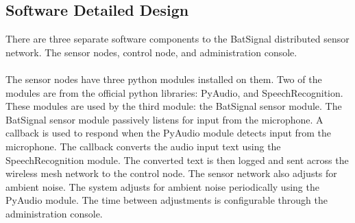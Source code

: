 \documentclass[11pt,a4paper]{article}
\begin{document}
\subsection{Software Detailed Design}
There are three separate software components to the BatSignal distributed sensor network.  The sensor nodes, control node, and administration console. \\\\
The sensor nodes have three python modules installed on them.  Two of the modules are from the official python libraries: PyAudio, and SpeechRecognition.  These modules are used by the third module: the BatSignal sensor module.  The BatSignal sensor module passively listens for input from the microphone.  A callback is used to respond when the PyAudio module detects input from the microphone.  The callback converts the audio input text using the SpeechRecognition module.  The converted text is then logged and sent across the wireless mesh network to the control node.  The sensor network also adjusts for ambient noise.  The system adjusts for ambient noise periodically using the PyAudio module.  The time between adjustments is configurable through the administration console. \\\\
\end{document}
